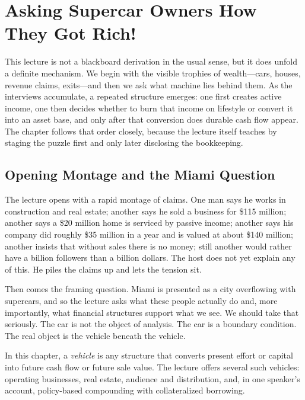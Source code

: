 \chapter{Asking Supercar Owners How They Got Rich!}

This lecture is not a blackboard derivation in the usual sense, but it does unfold a definite mechanism. We begin with the visible trophies of wealth---cars, houses, revenue claims, exits---and then we ask what machine lies behind them. As the interviews accumulate, a repeated structure emerges: one first creates active income, one then decides whether to burn that income on lifestyle or convert it into an asset base, and only after that conversion does durable cash flow appear. The chapter follows that order closely, because the lecture itself teaches by staging the puzzle first and only later disclosing the bookkeeping.

\section{Opening Montage and the Miami Question}

The lecture opens with a rapid montage of claims. One man says he works in construction and real estate; another says he sold a business for \$115 million; another says a \$20 million home is serviced by passive income; another says his company did roughly \$35 million in a year and is valued at about \$140 million; another insists that without sales there is no money; still another would rather have a billion followers than a billion dollars. The host does not yet explain any of this. He piles the claims up and lets the tension sit.

Then comes the framing question. Miami is presented as a city overflowing with supercars, and so the lecture asks what these people actually do and, more importantly, what financial structures support what we see. We should take that seriously. The car is not the object of analysis. The car is a boundary condition. The real object is the vehicle beneath the vehicle.

\begin{definition}
In this chapter, a \emph{vehicle} is any structure that converts present effort or capital into future cash flow or future sale value. The lecture offers several such vehicles: operating businesses, real estate, audience and distribution, and, in one speaker's account, policy-based compounding with collateralized borrowing.
\end{definition}

